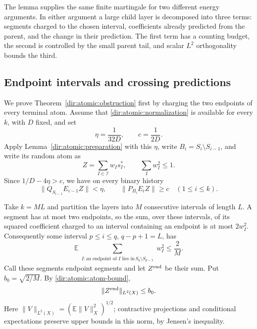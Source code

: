 The lemma supplies the same finite martingale for two different energy
arguments. In either argument a large child layer is decomposed into
three terms: segments charged to the chosen interval, coefficients
already predicted from the parent, and the change in their prediction.
The first term has a counting budget, the second is controlled by the
small parent tail, and scalar $L^2$ orthogonality bounds the third.

\subsection{Endpoint intervals and crossing predictions}
\label{dir:atomic:endpoint-route}

We prove Theorem~\ref{dir:atomic:obstruction} first by charging the two
endpoints of every terminal atom.  Assume that \eqref{dir:atomic:normalization}
is available for every $k$, with $D$ fixed, and set
\begin{equation}\label{dir:atomic:endpoint-constants}
 \eta=\frac1{32D},\qquad c=\frac1{2D}.
\end{equation}
Apply Lemma~\ref{dir:atomic:preparation} with this $\eta$, write
$B_i=S_i\setminus S_{i-1}$, and write its random atom as
\[
 Z=\sum_{I\in\mathcal I}w_I s_I^*,\qquad \sum_Iw_I^2\le1.
\]
Since $1/D-4\eta>c$, we have on every binary history
\begin{equation}\label{dir:atomic:endpoint-layer}
 \|Q_{S_{i-1}}E_{i-1}Z\|<\eta,\qquad
 \|P_{B_i}E_iZ\|\ge c
 \quad(1\le i\le k).
\end{equation}

Take $k=ML$ and partition the layers into $M$ consecutive intervals of
length $L$.  A segment has at most two endpoints, so the sum, over these
intervals, of its squared coefficient charged to an interval containing
an endpoint is at most $2w_I^2$.  Consequently some interval $p\le i\le q$,
$q-p+1=L$, has
\[
 \mathbb E\sum_{\substack{I:\text{an endpoint of }I\text{ lies in}
                   \,S_q\setminus S_{p-1}}}w_I^2\le\frac2M.
\]
Call these segments endpoint segments and let $Z^{\rm end}$ be their
sum.  Put $b_0=\sqrt{2/M}$.  By \eqref{dir:atomic:atom-bound},
\begin{equation}\label{dir:atomic:endpoint-error}
 \|Z^{\rm end}\|_{L^2(X)}\le b_0.
\end{equation}
Here $\|V\|_{L^2(X)}=(\mathbb E\|V\|_X^2)^{1/2}$; contractive
projections and conditional expectations preserve upper bounds in this
norm, by Jensen's inequality.


